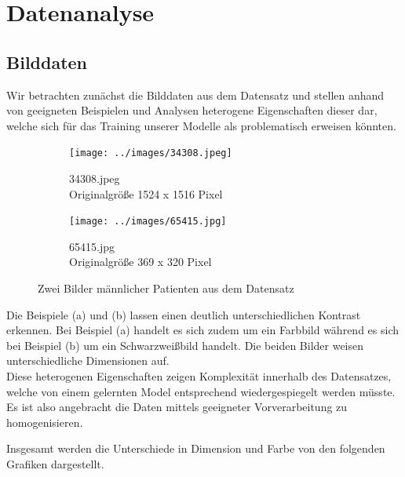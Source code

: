 \chapter{Datenanalyse}
\label{ch:data_analysis}

\section{Bilddaten}
\newlength{\imagewidth}

Wir betrachten zunächst die Bilddaten aus dem Datensatz und stellen anhand von geeigneten Beispielen und Analysen heterogene Eigenschaften dieser dar, welche sich für das Training unserer Modelle als problematisch erweisen könnten.

\begin{figure}[ht]
	\centering
	\begin{subfigure}[b]{0.45\textwidth}
		\texttt{[image: ../images/34308.jpeg]}
		\caption{34308.jpeg\\Originalgröße 1524 x 1516 Pixel}
	\end{subfigure} \hfill
	\begin{subfigure}[b]{0.45\textwidth}
		\texttt{[image: ../images/65415.jpg]}
		\caption{65415.jpg\\Originalgröße 369 x 320 Pixel}
	\end{subfigure}
	\caption{Zwei Bilder männlicher Patienten aus dem Datensatz}
\end{figure}

Die Beispiele (a) und (b) lassen einen deutlich unterschiedlichen Kontrast erkennen. Bei Beispiel (a) handelt es sich zudem um ein Farbbild während es sich bei Beispiel (b) um ein Schwarzweißbild handelt. Die beiden Bilder weisen unterschiedliche Dimensionen auf.\\
Diese heterogenen Eigenschaften zeigen Komplexität innerhalb des Datensatzes, welche von einem gelernten Model entsprechend wiedergespiegelt werden müsste. Es ist also angebracht die Daten mittels geeigneter Vorverarbeitung zu homogenisieren.

\pagebreak

Insgesamt werden die Unterschiede in Dimension und Farbe von den folgenden Grafiken dargestellt.


